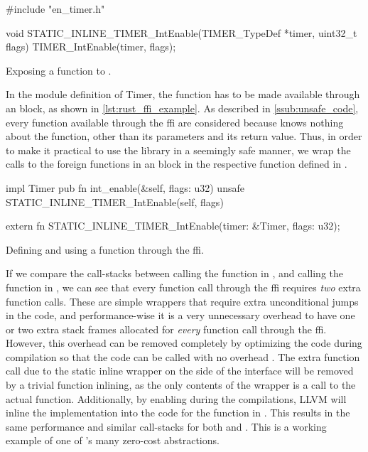 \begin{listing}[h]
\begin{ccode}
#include "en_timer.h"

void STATIC_INLINE_TIMER_IntEnable(TIMER_TypeDef *timer,
                                   uint32_t flags) {
  TIMER_IntEnable(timer, flags);
}
\end{ccode}
\caption{Exposing a  function to {\rust}.}
\label{lst:exposing_static_inline}
\end{listing}

In the {\rust} module definition of Timer, the function has to be made available through an  block, as shown in \autoref{lst:rust_ffi_example}.
As described in \autoref{ssub:unsafe_code}, every function available through the \gls{ffi} are considered {\unsafe} because {\rust} knows nothing about the function, other than its parameters and its return value.
Thus, in order to make it practical to use the library in a seemingly safe manner, we wrap the calls to the foreign functions in an {\unsafe} block in the respective function defined in {\rust}.

\begin{listing}[h]
\begin{rustcode}
impl Timer {
  pub fn int_enable(&self, flags: u32) {
    unsafe { STATIC_INLINE_TIMER_IntEnable(self, flags) }
  }
}

extern {
  fn STATIC_INLINE_TIMER_IntEnable(timer: &Timer, flags: u32);
}
\end{rustcode}
\caption{Defining and using a function through the {\rust} \gls{ffi}.}
\label{lst:rust_ffi_example}
\end{listing}

If we compare the call-stacks between calling the  function in {\rust}, and calling the  function in {\C}, we can see that every function call through the \gls{ffi} requires \emph{two} extra function calls.
These are simple wrappers that require extra unconditional jumps in the code, and performance-wise it is a very unnecessary overhead to have one or two extra stack frames allocated for \emph{every} function call through the \gls{ffi}.
However, this overhead can be removed completely by optimizing the code during compilation so that the {\C} code can be called with no overhead \cite{web:rust_once_run_everywhere}.
The extra function call due to the static inline wrapper on the {\C} side of the interface will be removed by a trivial function inlining, as the only contents of the wrapper is a call to the actual function.
Additionally, by enabling  during the compilations, LLVM will inline the {\C} implementation into the code for the  function in {\rust}.
This results in the same performance and similar call-stacks for both {\C} and {\rust}.
This is a working example of one of {\rust}'s many zero-cost abstractions.

